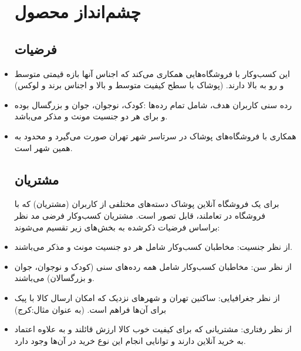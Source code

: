 \documentclass[14pt]{article}
\begin{document}
\begin{flushright}
\begin{itemize}
\section{ چشم‌انداز محصول}

\subsection{فرضیات}

\item این کسب‌و‌کار با فروشگاه‌هایی همکاری می‌کند که اجناس آنها بازه قیمتی متوسط و رو به بالا دارند. (پوشاک با سطح کیفیت متوسط و بالا و اجناس برند و لوکس)
\item رده سنی کاربران هدف، شامل تمام رده‌ها :‌کودک، نوجوان، جوان و بزرگسال بوده و برای هر دو جنسیت مونث و مذکر می‌باشد.
\item همکاری با فروشگاه‌های پوشاک در سرتاسر شهر تهران صورت می‌گیرد و محدود به همین شهر است.

\subsection{مشتریان}


برای یک فروشگاه آنلاین پوشاک دسته‌های مختلفی از کاربران (مشتریان) که با فروشگاه در تعاملند،‌ قابل تصور است. مشتریان کسب‌و‌کار فرضی مد نظر براساس فرضیات ذکرشده به بخش‌های زیر تقسیم می‌شوند:
\item از نظر جنسیت: مخاطبان کسب‌و‌کار شامل هر دو جنسیت مونث و مذکر می‌باشند.
\item از نظر سن:‌ مخاطبان کسب‌و‌کار شامل همه رده‌های سنی (کودک و نوجوان، جوان و بزرگسالان) می‌باشند.
\item از نظر جغرافیایی: ساکنین تهران و شهرهای نزدیک که امکان ارسال کالا با پیک برای آن‌ها فراهم است. (به عنوان مثال:‌کرج)
\item از نظر رفتاری‌: مشتریانی که برای کیفیت خوب کالا ارزش قائلند و به علاوه اعتماد به خرید آنلاین دارند و توانایی انجام این نوع خرید در آن‌ها وجود دارد.



\end{itemize}
\end{flushright}
\end{document}
